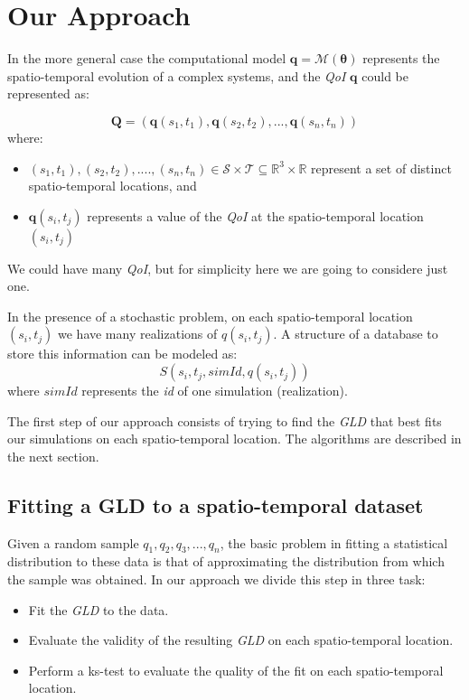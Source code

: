 \chapter{Our Approach}\label{cap:our_approach}

In the more general case the computational model $\bm{q}=\mathcal{M}(\bm{\theta})$ represents the spatio-temporal evolution of a complex systems, and the \textit{QoI} $\bm{q}$ could be represented as:  

\begin{equation} \label{eq:spatio_temporal}
\mathbf{Q} = (\mathbf{q}(s_{1},t_{1}),\mathbf{q}(s_{2},t_{2}),...,\mathbf{q}(s_{n},t_{n}))  
\end{equation}
where:
\begin{itemize}
\item $(s_{1},t_{1}),(s_{2},t_{2}),....,(s_{n},t_{n}) \in \mathcal{S} \times \mathcal{T}\subseteq\mathbb{R}^{3}\times\mathbb{R}$ represent a set of distinct spatio-temporal locations, and
\item $\mathbf{q}(s_{i},t_{j})$ represents a value of the \textit{QoI} at the spatio-temporal location $(s_{i},t_{j})$
\end{itemize}
We could have many \textit{QoI}, but for simplicity here we are going to considere just one.

In the presence of a stochastic problem, on each spatio-temporal location $(s_{i},t_{j})$ we have many realizations of $q(s_{i},t_{j})$. A structure of a database to store this information can be modeled as:
\begin{equation}\label{eq:data_base_structure}
S(s_{i},t_{j},simId,q(s_{i},t_{j}))
\end{equation}
where $simId$ represents the \textit{id} of one simulation (realization).

The first step of our approach consists of trying to find the \textit{GLD} that best fits our simulations on each spatio-temporal location. The algorithms are described in the next section.

\section{Fitting a GLD to a spatio-temporal dataset}
Given a random sample $q_{1}, q_{2}, q_{3},...,q_{n}$, the basic problem in fitting a statistical distribution to these data is that of approximating the distribution from which the sample was obtained. In our approach we divide this step in three task:
\begin{itemize}
\item Fit the \textit{GLD} to the data.
\item Evaluate the validity of the resulting \textit{GLD} on each spatio-temporal location.
\item Perform a ks-test to evaluate the quality of the fit on each spatio-temporal location.
\end{itemize}

